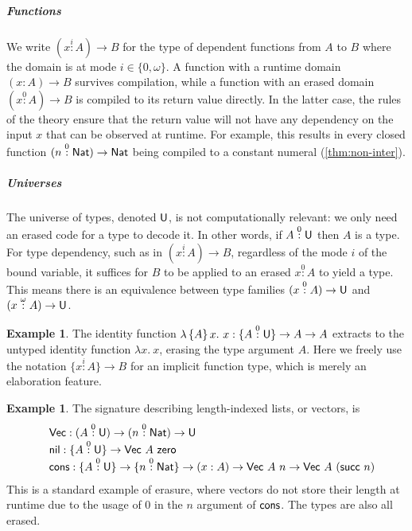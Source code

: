 \documentclass[10pt,a4paper]{article}
\theoremstyle{definition}
\newtheorem{example}[theorem]{Example}
\theoremstyle{remark}
\newcommand{\s}[1]{{\ensuremath{\textsf{\upshape #1}}}\xspace}
\newcommand{\col}[1]{\stackrel{#1}{:}}
\begin{document}
\subparagraph{Functions}\label{ssub:dep-funcs} We write $(x \col{i} A) \to B$
for the type of dependent functions from $A$ to $B$ where the domain is at mode
$i \in \{0, \omega\}$. A function with a runtime domain $(x : A) \to B$ survives
compilation, while a function with an erased domain $(x \col{0} A) \to B$ is
compiled to its return value directly. In the latter case, the rules of the
theory ensure that the return value will not have any dependency on the input
$x$ that can be observed at runtime. For example, this results in every closed
function $(n \col{0} \s{Nat}) \to \s{Nat}$ being compiled to a constant numeral
(\cref{thm:non-inter}).

\subparagraph{Universes}\label{ssub:universes} The universe of types, denoted
$\s U$, is not computationally relevant: we only need an erased code for a type
to decode it. In other words, if $A \col{0} \s U$ then $A$ is a type. For type
dependency, such as in $(x \col{i} A) \to B$, regardless of the mode $i$ of the
bound variable, it suffices for $B$ to be applied to an erased $x \col{0} A$ to
yield a type. This means there is an equivalence between type families $(x
\col{0} A) \to \s{U}$ and $(x \col{\omega} A) \to \s{U}$.

\begin{example}
 The identity function $\lambda \, \{A\} \, x.\ x : \{A \col{0} \s{U}\} \to A \to A$
  extracts to the untyped identity function $\lambda x.\ x$, erasing the type argument $A$.
  Here we freely use the notation $\{x \col{i} A\} \to B$ for an implicit
  function type, which is merely an elaboration feature.
\end{example}

\begin{example}\label{ex:vec}
The signature describing length-indexed lists, or vectors, is
\[\begin{array}{ll}
 & \s{Vec} : (A  \col{0} \s{U}) \to (n \col{0} \s{Nat}) \to \s{U} \\
 & \s{nil} : \{A  \col{0} \s{U}\} \to \s{Vec}\ A\ \s{zero} \\
 & \s{cons} : \{A \col{0} \s{U}\} \to \{n \col{0} \s{Nat}\} \to (x : A) \to \s{Vec}\ A\ n \to \s{Vec}\ A\ (\s{succ}\ n) \\
\end{array}\] This is a standard example of erasure, where vectors do not store
their length at runtime due to the usage of $0$ in the $n$ argument of
$\s{cons}$. The types are also all erased.
\end{example}
\end{document}
